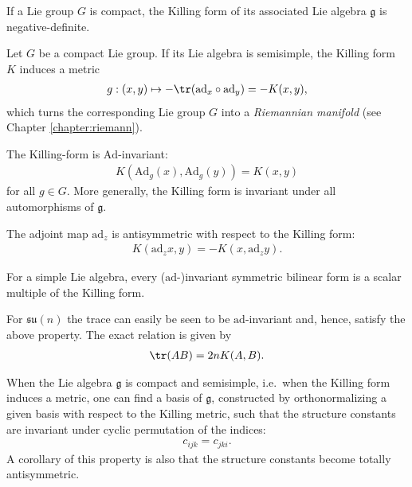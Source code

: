     \begin{property}
        If a Lie group $G$ is compact, the Killing form of its associated Lie algebra $\mathfrak{g}$ is negative-definite.
    \end{property}
    \begin{result}
        Let $G$ be a compact Lie group. If its Lie algebra is semisimple, the Killing form $K$ induces a metric
        \begin{gather}
            g:(x,y)\mapsto -\tr(\mathrm{ad}_x\circ\mathrm{ad}_y) = -K(x,y),
        \end{gather}
        which turns the corresponding Lie group $G$ into a \textit{Riemannian manifold} (see Chapter \ref{chapter:riemann}).
    \end{result}

    \begin{property}
        The Killing-form is $\mathrm{Ad}$-invariant:
        \begin{gather}
            K(\mathrm{Ad}_g(x),\mathrm{Ad}_g(y)) = K(x,y)
        \end{gather}
        for all $g\in G$. More generally, the Killing form is invariant under all automorphisms of $\mathfrak{g}$.
    \end{property}
    \begin{result}
        The adjoint map $\mathrm{ad}_z$ is antisymmetric with respect to the Killing form:
        \begin{gather}
            \label{lie:ad_killing_form}
            K(\mathrm{ad}_zx,y) = -K(x,\mathrm{ad}_zy).
        \end{gather}
    \end{result}

    \begin{property}\label{lie:killing_trace}
        For a simple Lie algebra, every ($\mathrm{ad}$-)invariant symmetric bilinear form is a scalar multiple of the Killing form.
    \end{property}
    \begin{example}
        For $\mathfrak{su}(n)$ the trace can easily be seen to be $\mathrm{ad}$-invariant and, hence, satisfy the above property. The exact relation is given by
        \begin{gather}
            \tr(AB) = 2nK(A,B).
        \end{gather}
    \end{example}

    \begin{property}
        When the Lie algebra $\mathfrak{g}$ is compact and semisimple, i.e.~when the Killing form induces a metric, one can find a basis of $\mathfrak{g}$, constructed by orthonormalizing a given basis with respect to the Killing metric, such that the structure constants are invariant under cyclic permutation of the indices:
        \begin{gather}
            c_{ijk} = c_{jki}.
        \end{gather}
        A corollary of this property is also that the structure constants become totally antisymmetric.
    \end{property}

